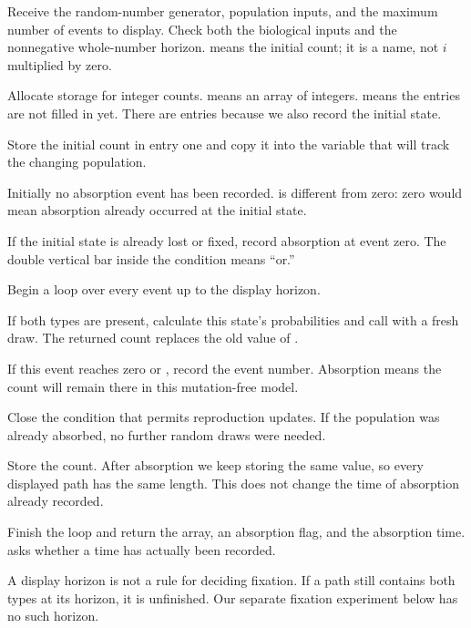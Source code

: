 \begin{description}[style=nextline]
\item[Lines 47--49] Receive the random-number generator, population inputs, and the maximum number of events to display. Check both the biological inputs and the nonnegative whole-number horizon.  means the initial count; it is a name, not \(i\) multiplied by zero.
\item[Line 50] Allocate storage for integer counts.  means an array of integers.  means the entries are not filled in yet. There are  entries because we also record the initial state.
\item[Lines 51--52] Store the initial count in entry one and copy it into the variable that will track the changing population.
\item[Line 53] Initially no absorption event has been recorded.  is different from zero: zero would mean absorption already occurred at the initial state.
\item[Lines 54--56] If the initial state is already lost or fixed, record absorption at event zero. The double vertical bar inside the  condition means ``or.''
\item[Line 57] Begin a loop over every event up to the display horizon.
\item[Lines 58--60] If both types are present, calculate this state's probabilities and call  with a fresh draw. The returned count replaces the old value of .
\item[Lines 61--63] If this event reaches zero or , record the event number. Absorption means the count will remain there in this mutation-free model.
\item[Line 64] Close the condition that permits reproduction updates. If the population was already absorbed, no further random draws were needed.
\item[Line 65] Store the count. After absorption we keep storing the same value, so every displayed path has the same length. This does not change the time of absorption already recorded.
\item[Lines 66--68] Finish the loop and return the array, an absorption flag, and the absorption time.  asks whether a time has actually been recorded.
\end{description}

A display horizon is not a rule for deciding fixation. If a path still contains both types at its horizon, it is unfinished. Our separate fixation experiment below has no such horizon.


